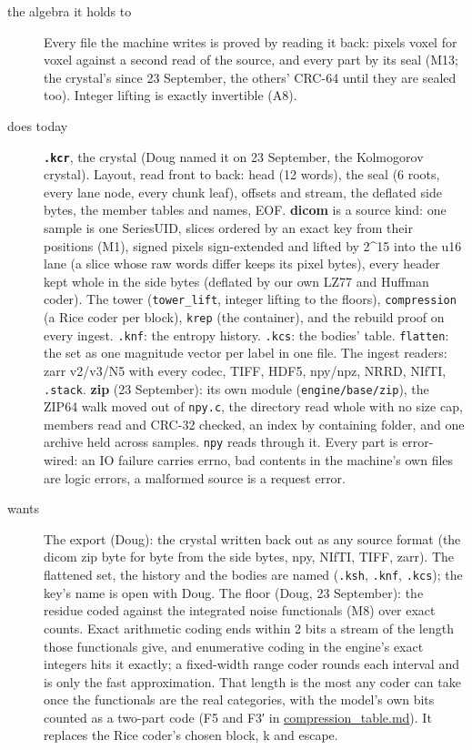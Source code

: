 \begin{description}
\item[{the algebra it holds to}] Every file the machine writes is proved by reading it back: pixels voxel for voxel against a second read of the source, and every part by its seal (M13; the crystal's since 23 September, the others' CRC-64 until they are sealed too). Integer lifting is exactly invertible (A8).
\item[{does today}] \textbf{\texttt{.\allowbreak{}kcr}}, the crystal (Doug named it on 23 September, the Kolmogorov crystal). Layout, read front to back: head (12 words), the seal (6 roots, every lane node, every chunk leaf), offsets and stream, the deflated side bytes, the member tables and names, EOF. \textbf{dicom} is a source kind: one sample is one SeriesUID, slices ordered by an exact key from their positions (M1), signed pixels sign-extended and lifted by 2\textasciicircum{}15 into the u16 lane (a slice whose raw words differ keeps its pixel bytes), every header kept whole in the side bytes (deflated by our own LZ77 and Huffman coder). The tower (\texttt{tower\_\allowbreak{}lift}, integer lifting to the floors), \texttt{compression} (a Rice coder per block), \texttt{krep} (the container), and the rebuild proof on every ingest. \texttt{.\allowbreak{}knf}: the entropy history. \texttt{.\allowbreak{}kcs}: the bodies' table. \texttt{flatten}: the set as one magnitude vector per label in one file. The ingest readers: zarr v2/v3/N5 with every codec, TIFF, HDF5, npy/npz, NRRD, NIfTI, \texttt{.\allowbreak{}stack}. \textbf{zip} (23 September): its own module (\texttt{engine/\allowbreak{}base/\allowbreak{}zip}), the ZIP64 walk moved out of \texttt{npy.\allowbreak{}c}, the directory read whole with no size cap, members read and CRC-32 checked, an index by containing folder, and one archive held across samples. \texttt{npy} reads through it. Every part is error-wired: an IO failure carries errno, bad contents in the machine's own files are logic errors, a malformed source is a request error.
\item[{wants}] The export (Doug): the crystal written back out as any source format (the dicom zip byte for byte from the side bytes, npy, NIfTI, TIFF, zarr). The flattened set, the history and the bodies are named (\texttt{.\allowbreak{}ksh}, \texttt{.\allowbreak{}knf}, \texttt{.\allowbreak{}kcs}); the key's name is open with Doug. The floor (Doug, 23 September): the residue coded against the integrated noise functionals (M8) over exact counts. Exact arithmetic coding ends within 2 bits a stream of the length those functionals give, and enumerative coding in the engine's exact integers hits it exactly; a fixed-width range coder rounds each interval and is only the fast approximation. That length is the most any coder can take once the functionals are the real categories, with the model's own bits counted as a two-part code (F5 and F3′ in \hyperref[chap:compression-table]{compression\_\allowbreak{}table.md}). It replaces the Rice coder's chosen block, k and escape.

\end{description}
